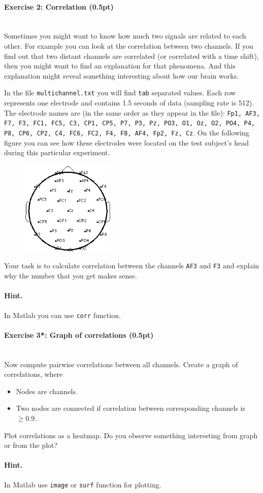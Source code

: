 \documentclass[a4paper,11pt]{article}
\newenvironment{exercise}[3]{\paragraph{Exercise #1: #2 (#3pt)}\ \\}{
\medskip}
\begin{document}
%
%
\begin{exercise}{2}{Correlation}{0.5}
Sometimes you might want to know how much two signals are related to each other. For example you can look at the correlation between two channels. If you find out that two distant channels are correlated (or correlated with a time shift), then you might want to find an explanation for that phenomena. And this explanation might reveal something interesting about how our brain works.

In the file \texttt{multichannel.txt} you will find \texttt{tab} separated values. Each row represents one electrode and contains 1.5 seconds of data (sampling rate is 512). The electrode names are (in the same order as they appear in the file): \texttt{Fp1, AF3, F7, F3, FC1, FC5, C3, CP1, CP5, P7, P3, Pz, PO3, O1, Oz, O2, PO4, P4, P8, CP6, CP2, C4, FC6, FC2, F4, F8, AF4, Fp2, Fz, Cz}. On the following figure you can see how these electrodes were located on the test subject's head during this particular experiment.
\begin{figure}[H]
   \centering
   \includegraphics[width=0.4\textwidth]{locations.png} 
\end{figure}
Your task is to calculate correlation between the channels \texttt{AF3} and \texttt{F3} and explain why the number that you get makes sense.
\paragraph{Hint.} In Matlab you can use \texttt{corr} function.
\end{exercise}


%
%
\begin{exercise}{3*}{Graph of correlations}{0.5}
Now compute pairwise correlations between all channels. Create a graph of correlations, where
\begin{itemize}
	\item Nodes are channels.
	\item Two nodes are connected if correlation between corresponding channels is $\geq 0.9$.
\end{itemize}
Plot correlations as a heatmap. Do you observe something interesting from graph or from the plot?
\paragraph{Hint.} In Matlab use \texttt{image} or \texttt{surf} function for plotting.
\end{exercise}
\end{document}
